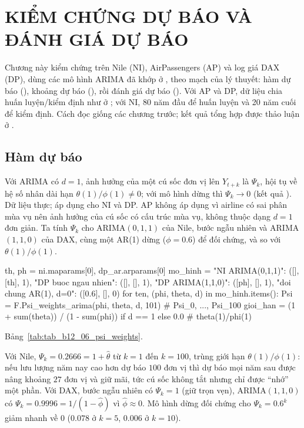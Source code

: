 \clearpage
\section[Kiểm chứng dự báo và đánh giá dự báo]{KIỂM CHỨNG DỰ BÁO VÀ ĐÁNH GIÁ DỰ BÁO}

Chương này kiểm chứng  trên Nile (NI), AirPassengers (AP) và log giá DAX (DP), dùng các mô hình ARIMA đã khớp ở , theo mạch của lý thuyết: hàm dự báo (), khoảng dự báo (), rồi đánh giá dự báo (). Với AP và DP, dữ liệu chia huấn luyện/kiểm định như ở ; với NI, 80 năm đầu để huấn luyện và 20 năm cuối để kiểm định. Cách đọc giống các chương trước; kết quả tổng hợp được thảo luận ở .

\subsection{Hàm dự báo}

 Với ARIMA có $d=1$, ảnh hưởng của một cú sốc đơn vị lên $Y_{t+k}$ là $\Psi_k$, hội tụ về hệ số nhân dài hạn $\theta(1)/\phi(1)\ne0$; với mô hình dừng thì $\Psi_k\to0$ (kết quả ).
 Dữ liệu thực; áp dụng cho NI và DP. AP không áp dụng vì airline có sai phân mùa vụ nên ảnh hưởng của cú sốc có cấu trúc mùa vụ, không thuộc dạng $d=1$ đơn giản. Ta tính $\Psi_k$ cho ARIMA$(0,1,1)$ của Nile, bước ngẫu nhiên và ARIMA$(1,1,0)$ của DAX, cùng một AR(1) dừng ($\phi=0.6$) để đối chứng, và so với $\theta(1)/\phi(1)$.
\begin{codeblock}
th, ph = ni.maparams[0], dp_ar.arparams[0]
mo_hinh = {"NI ARIMA(0,1,1)": ([], [th], 1), "DP buoc ngau nhien": ([], [], 1),
           "DP ARIMA(1,1,0)": ([ph], [], 1), "doi chung AR(1), d=0": ([0.6], [], 0)}
for ten, (phi, theta, d) in mo_hinh.items():
    Psi = F.Psi_weights_arima(phi, theta, d, 101)             # Psi_0, ..., Psi_100
    gioi_han = (1 + sum(theta)) / (1 - sum(phi)) if d == 1 else 0.0   # theta(1)/phi(1)
\end{codeblock}
 Bảng~\ref{tab:tab_b12_06_psi_weights}.

 Với Nile, $\Psi_k=0.2666=1+\hat\theta$ từ $k=1$ đến $k=100$, trùng giới hạn $\theta(1)/\phi(1)$: nếu lưu lượng năm nay cao hơn dự báo $100$ đơn vị thì dự báo mọi năm sau được nâng khoảng $27$ đơn vị và giữ mãi, tức cú sốc không tắt nhưng chỉ được ``nhớ'' một phần. Với DAX, bước ngẫu nhiên có $\Psi_k=1$ (giữ trọn vẹn), ARIMA$(1,1,0)$ có $\Psi_k=0.9996=1/(1-\hat\phi)$ vì $\hat\phi\approx0$. Mô hình dừng đối chứng cho $\Psi_k=0.6^k$ giảm nhanh về $0$ ($0.078$ ở $k=5$, $0.006$ ở $k=10$).

